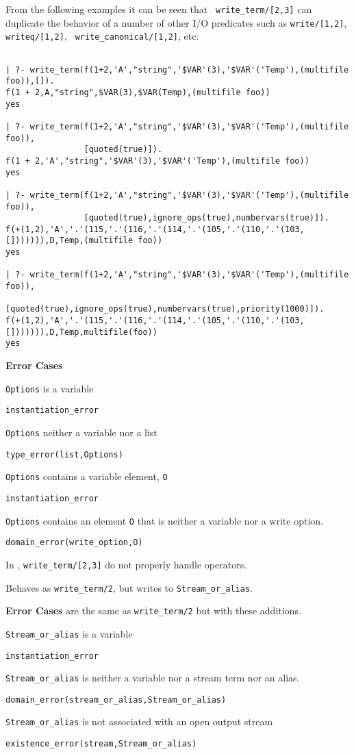 \begin{description}
From the following examples it can be seen that {\tt
write\_term/[2,3]} can duplicate the behavior of a number of other
I/O predicates such as {\tt write/[1,2]}, {\tt writeq/[1,2]}, {\tt
write\_canonical/[1,2]}, etc.
{\small
\begin{verbatim}

| ?- write_term(f(1+2,'A',"string",'$VAR'(3),'$VAR'('Temp'),(multifile foo)),[]).
f(1 + 2,A,"string",$VAR(3),$VAR(Temp),(multifile foo))
yes

| ?- write_term(f(1+2,'A',"string",'$VAR'(3),'$VAR'('Temp'),(multifile foo)),
                [quoted(true)]).
f(1 + 2,'A',"string",'$VAR'(3),'$VAR'('Temp'),(multifile foo))
yes

| ?- write_term(f(1+2,'A',"string",'$VAR'(3),'$VAR'('Temp'),(multifile foo)),
                [quoted(true),ignore_ops(true),numbervars(true)]).
f(+(1,2),'A','.'(115,'.'(116,'.'(114,'.'(105,'.'(110,'.'(103,[])))))),D,Temp,(multifile foo))
yes

| ?- write_term(f(1+2,'A',"string",'$VAR'(3),'$VAR'('Temp'),(multifile foo)),
                [quoted(true),ignore_ops(true),numbervars(true),priority(1000)]).
f(+(1,2),'A','.'(115,'.'(116,'.'(114,'.'(105,'.'(110,'.'(103,[])))))),D,Temp,multifile(foo))
yes
\end{verbatim}
}

{\bf Error Cases} 
\bi
\item 	{\tt Options} is a variable
\bi
\item    {\tt instantiation\_error}
\ei
\item 	{\tt Options} neither a variable nor a list
\bi
\item    {\tt type\_error(list,Options)}
\ei
\item 	{\tt Options} contains a variable element, {\tt O}
\bi
\item    {\tt instantiation\_error}
\ei
\item 	{\tt Options} contains an element {\tt O} that is neither a variable
nor a write option.
\bi
\item    {\tt domain\_error(write\_option,O)}
\ei
\ei

\compatibility In \version{}, {\tt write\_term/[2,3]} do not properly
handle operators.

% 
Behaves as {\tt write\_term/2}, but writes to {\tt Stream\_or\_alias}.

{\bf Error Cases} are the same as {\tt write\_term/2} but with these
additions.
\bi
\item 	{\tt Stream\_or\_alias} is a variable
\bi
\item {\tt instantiation\_error}
\ei
\item 	{\tt Stream\_or\_alias} is neither a variable nor a stream term nor an alias.
\bi
\item 	{\tt domain\_error(stream\_or\_alias,Stream\_or\_alias)}
\ei
\item 	{\tt Stream\_or\_alias} is not associated with an open output stream
\bi
\item 	{\tt existence\_error(stream,Stream\_or\_alias)}
\ei
\ei


\end{description}
